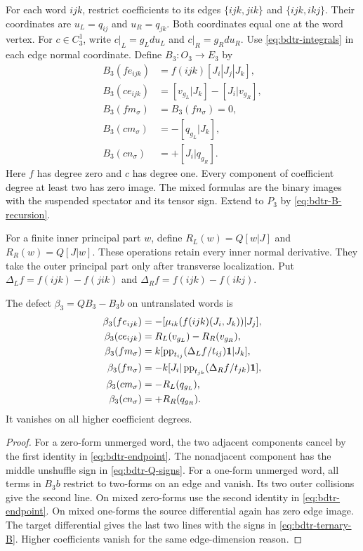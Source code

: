 For each word $ijk$, restrict coefficients to its edges $\{ijk,jik\}$ and $\{ijk,ikj\}$.
Their coordinates are $u_L=q_{ij}$ and $u_R=q_{jk}$.
Both coordinates equal one at the word vertex.
For $c\in C_3^1$, write $c|_L=g_Ldu_L$ and $c|_R=g_Rdu_R$.
Use \eqref{eq:bdtr-integrals} in each edge normal coordinate.
Define $B_3:O_3\to E_3$ by
\begin{equation}\label{eq:bdtr-ternary-B}
 \begin{aligned}
 B_3(fe_{ijk})&=f(ijk)[J_i|J_j|J_k],\\
 B_3(ce_{ijk})&=[v_{g_L}|J_k]-[J_i|v_{g_R}],\\
 B_3(fm_\sigma)&=B_3(fn_\sigma)=0,\\
 B_3(cm_\sigma)&=-[q_{g_L}|J_k],\\
 B_3(cn_\sigma)&=+[J_i|q_{g_R}].
 \end{aligned}
\end{equation}
Here $f$ has degree zero and $c$ has degree one.
Every component of coefficient degree at least two has zero image.
The mixed formulas are the binary images with the suspended spectator and its tensor sign.
Extend to $P_3$ by \eqref{eq:bdtr-B-recursion}.

For a finite inner principal part $w$, define
$R_L(w)=Q[w|J]$ and $R_R(w)=Q[J|w]$.
These operations retain every inner normal derivative.
They take the outer principal part only after transverse localization.
Put $\Delta_Lf=f(ijk)-f(jik)$ and $\Delta_Rf=f(ijk)-f(ikj)$.

\begin{lemma}\label{lem:bdtr-defect-table}
The defect $\beta_3=QB_3-B_3b$ on untranslated words is
\begin{equation}\label{eq:bdtr-defect-table}
 \begin{aligned}
 \beta_3(fe_{ijk})&=-[\mu_{ik}(f(ijk)(J_i,J_k))|J_j],\\
 \beta_3(ce_{ijk})&=R_L(v_{g_L})-R_R(v_{g_R}),\\
 \beta_3(fm_\sigma)&=k[\operatorname{pp}_{t_{ij}}(\Delta_Lf/t_{ij})\mathbf1|J_k],\\
 \beta_3(fn_\sigma)&=-k[J_i|\operatorname{pp}_{t_{jk}}(\Delta_Rf/t_{jk})\mathbf1],\\
 \beta_3(cm_\sigma)&=-R_L(q_{g_L}),\\
 \beta_3(cn_\sigma)&=+R_R(q_{g_R}).
 \end{aligned}
\end{equation}
It vanishes on all higher coefficient degrees.
\end{lemma}
\begin{proof}
For a zero-form unmerged word, the two adjacent components cancel by the first identity in \eqref{eq:bdtr-endpoint}.
The nonadjacent component has the middle unshuffle sign in \eqref{eq:bdtr-Q-signs}.
For a one-form unmerged word, all terms in $B_3b$ restrict to two-forms on an edge and vanish.
Its two outer collisions give the second line.
On mixed zero-forms use the second identity in \eqref{eq:bdtr-endpoint}.
On mixed one-forms the source differential again has zero edge image.
The target differential gives the last two lines with the signs in \eqref{eq:bdtr-ternary-B}.
Higher coefficients vanish for the same edge-dimension reason.
\end{proof}

